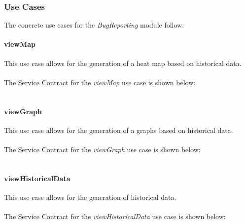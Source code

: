\documentclass[11pt,a4paper,titlepage]{article}
\begin{document}
		\subsubsection{Use Cases}
		The concrete use cases for the \textit{BugReporting} module follow:
		\paragraph{viewMap }
		This use case allows for the generation of a heat map based on historical data.\\\hfill\\
		The Service Contract for the \textit{viewMap} use case is shown below:\\\hfill\\		
		
		\paragraph{viewGraph }
		This use case allows for the generation of a graphs based on historical data.\\\hfill\\
		The Service Contract for the \textit{viewGraph} use case is shown below:\\\hfill\\		
		
		\paragraph{viewHistoricalData }
		This use case allows for the generation of historical data.\\\hfill\\
		The Service Contract for the \textit{viewHistoricalData} use case is shown below:\\\hfill\\

	
		
		
	


%  
\end{document}
